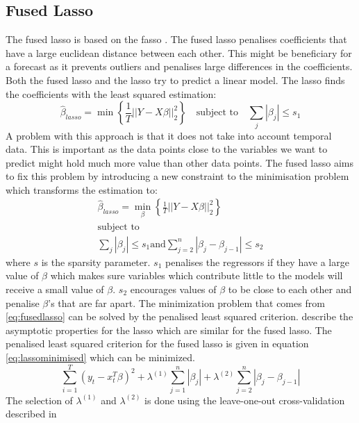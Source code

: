 \subsection{Fused Lasso}
\label{subsec:flasso}
The fused lasso \citep{Tibshirani2005SparsityLasso} is based on the fasso \citep{Tibshirani1996RegressionLasso}. The fused lasso penalises coefficients that have a large euclidean distance between each other. This might be beneficiary for a forecast as it prevents outliers and penalises large differences in the coefficients. Both the fused lasso and the lasso try to predict a linear model. The lasso finds the coefficients with the least squared estimation: $$\hat{\beta}_{lasso} = \min \left\{\frac{1}{T}||Y - X\beta||_2^2\right\}\quad \text{subject to} \quad \sum_j|\beta_j| \leq s_1$$
A problem with this approach is that it does not take into account temporal data. This is important as the data points close to the variables we want to predict might hold much more value than other data points. The fused lasso aims to fix this problem by introducing a new constraint to the minimisation problem which transforms the estimation to: 
\begin{equation}
\label{eq:fusedlasso}
  \begin{gathered}
    \hat{\beta}_{lasso} = \min\limits_{\beta} \left\{\frac{1}{T}||Y - X\beta||_2^2\right\}\\
    \text{subject to} \\
    \sum_j|\beta_j| \leq s_1 \text{and} \sum^n_{j=2}|\beta_j-\beta_{j-1}|\leq s_2
\end{gathered}
\end{equation}
where $s$ is the sparsity parameter. $s_1$ penalises the regressors if they have a large value of $\beta$ which makes sure variables which contribute little to the models will receive a small value of $\beta$. $s_2$ encourages values of $\beta$ to be close to each other and penalise $\beta$'s that are far apart. The minimization problem that comes from \eqref{eq:fusedlasso} can be solved by the penalised least squared criterion. \cite{Knight2000AsymptoticsEstimators} describe the asymptotic properties for the lasso which are similar for the fused lasso. The penalised least squared criterion for the fused lasso is given in equation \eqref{eq:lassominimised} which can be minimized.
\begin{equation}
    \label{eq:lassominimised}
    \sum\limits_{i=1}^T (y_t - x_t^T\beta)^2 + \lambda^{(1)} \sum\limits^n_{j=1} |\beta_j| + \lambda^{(2)}\sum\limits^n_{j=2} |\beta_j - \beta_{j-1}|
\end{equation}
The selection of $\lambda^{(1)}$ and $\lambda^{(2)}$ is done using the leave-one-out cross-validation described in \cite{Hwang2016CrossAcceleration, Cawley2003EEcientClassifiers}
